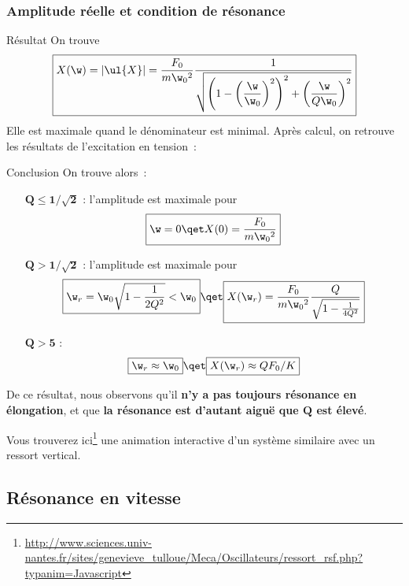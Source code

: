 \documentclass[../main/main.tex]{subfiles}
\begin{document}
\subsubsection{Amplitude réelle et condition de résonance}
\begin{rprop}{Résultat}
    On trouve
    \begin{gather*}
        \boxed{
        X(\w)
            = \left| \ul{X} \right|
            = \frac{F_0}{m\w_0{}^2}\frac{1}{
                    \sqrt{\left( 1 - \left(\dfrac{\w}{\w_0}\right)^2 \right)^2
                    + \left(\dfrac{\w}{Q\w_0}\right)^2}}
        }
    \end{gather*}
    Elle est maximale quand le dénominateur est minimal. Après calcul, on retrouve
    les résultats de l'excitation en tension~:
\end{rprop}
\begin{rror}{Conclusion}
    On trouve alors~:
    \begin{itemize}[leftmargin=60pt]
        \item[$\mathbf{Q \leq 1/\sqrt{2}}$] : l'amplitude est maximale pour
            \[\boxed{\w = 0 \qet X(0) = \frac{F_0}{m\w_0{}^2}}\]
        \item[$\mathbf{Q > 1/\sqrt{2}}$] : l'amplitude est maximale pour
            \[\boxed{\w_r = \w_0 \sqrt{1 - \frac{1}{2Q^2}} < \w_0}
                \qet
                \boxed{X(\w_r) = \frac{F_0}{m\w_0{}^2}
                    \frac{Q}{\sqrt{1 - \frac{1}{4Q^2}}}}
            \]
        \item[$\mathbf{Q > 5}$] :
            \[\boxed{\w_r \approx \w_0}
                \qet
                \boxed{X(\w_r) \approx QF_0/K}
            \]
    \end{itemize}
    De ce résultat, nous observons qu'il \textbf{n'y a pas toujours résonance en
    élongation}, et que \textbf{la résonance est d'autant aiguë que $\mathbf{Q}$
    est élevé}.
\end{rror}

Vous trouverez ici\footnote{\href{http://www.sciences.univ-nantes.fr/sites/genevieve\_tulloue/Meca/Oscillateurs/ressort\_rsf.php?typanim=Javascript}{http://www.sciences.univ-nantes.fr/sites/genevieve\_tulloue/Meca/Oscillateurs/ressort\_rsf.php?typanim=Javascript}} une animation interactive d'un système similaire avec un
ressort vertical.

\subsection{Résonance en vitesse}
\end{document}
